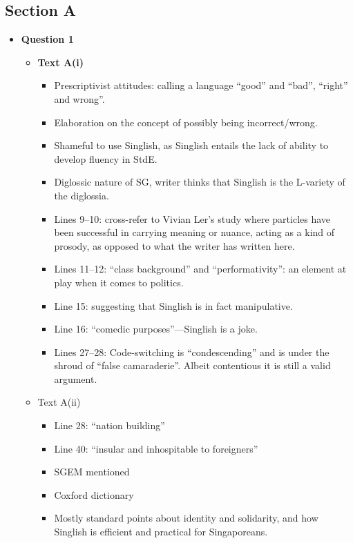 \documentclass[../main.tex]{subfiles}
\begin{document}
			\subsection*{Section A}
				\begin{itemize}
					\item \textbf{Question 1} \begin{itemize}
						\item \textbf{Text A(i)} \begin{itemize}
							\item Prescriptivist attitudes: calling a language ``good'' and ``bad'', ``right'' and wrong''.
							\item Elaboration on the concept of possibly being incorrect/wrong.
							\item Shameful to use Singlish, as Singlish entails the lack of ability to develop fluency in StdE.
							\item Diglossic nature of SG, writer thinks that Singlish is the L-variety of the diglossia.
							\item Lines 9--10: cross-refer to Vivian Ler's study where particles have been successful in carrying meaning or nuance, acting as a kind of prosody, as opposed to what the writer has written here.
							\item Lines 11--12: ``class background'' and ``performativity'': an element at play when it comes to politics.
							\item Line 15: suggesting that Singlish is in fact manipulative.
							\item Line 16: ``comedic purposes''---Singlish is a joke.
							\item Lines 27--28: Code-switching is ``condescending'' and is under the shroud of ``false camaraderie''. Albeit contentious it is still a valid argument.
						\end{itemize}
						\item Text A(ii) \begin{itemize}
							\item Line 28: ``nation building''
							\item Line 40: ``insular and inhospitable to foreigners''
							\item SGEM mentioned
							\item Coxford dictionary
							\item Mostly standard points about identity and solidarity, and how Singlish is efficient and practical for Singaporeans.
						\end{itemize}
					\end{itemize}


\end{itemize}
\end{document}
